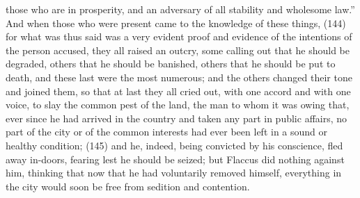 those who are in prosperity, and an adversary of all stability and wholesome law.'' And when those
who were present came to the knowledge of these things, (144) for what was thus said was a very
evident proof and evidence of the intentions of the person accused, they all raised an outcry, some
calling out that he should be degraded, others that he should be banished, others that he should be
put to death, and these last were the most numerous; and the others changed their tone and joined
them, so that at last they all cried out, with one accord and with one voice, to slay the common pest
of the land, the man to whom it was owing that, ever since he had arrived in the country and taken
any part in public affairs, no part of the city or of the common interests had ever been left in a
sound or healthy condition; (145) and he, indeed, being convicted by his conscience, fled away
in-doors, fearing lest he should be seized; but Flaccus did nothing against him, thinking that now
that he had voluntarily removed himself, everything in the city would soon be free from sedition and
contention.

